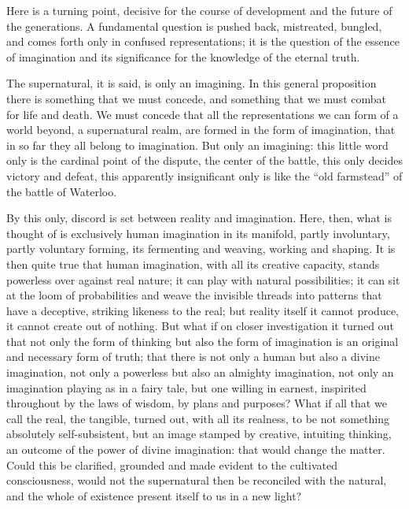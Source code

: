 \documentclass[12pt,a4paper,openany]{book}
\newcommand{\opage}[1]{\marginnote{\footnotesize\textit{[#1]}}}
\begin{document}
Here is a turning point, decisive for the course of development and the future of the generations. A fundamental
question is
\setcounter{footnote}{0}%
\opage{11}pushed back, mistreated, bungled, and comes forth only in confused representations; it is the question of
the essence of imagination and its significance for the knowledge of the eternal truth.

The supernatural, it is said, is only an imagining. In this general proposition there is something that we must
concede, and something that we must combat for life and death. We must concede that all the representations we can
form of a world beyond, a supernatural realm, are formed in the form of imagination, that in so far they all belong to
imagination. But only an imagining: this little word only is the cardinal point of the dispute, the center of the
battle, this only decides victory and defeat, this apparently insignificant only is like the ``old farmstead'' of the
battle of Waterloo.

By this only, discord is set between reality and imagination. Here, then, what is thought of is exclusively human
imagination in its manifold, partly involuntary, partly voluntary forming, its fermenting and weaving, working and
shaping. It is then quite true that human imagination, with all its creative capacity, stands powerless over against
real nature; it can play with natural possibilities; it can sit at the loom of probabilities and weave the invisible
threads into patterns that have a deceptive, striking likeness to the real; but reality itself it cannot produce, it
cannot create out of nothing. But what if on closer investigation it turned out that not only the form of thinking but
also the form of imagination is an original and necessary form of truth; that there is not only a human but also a
divine imagination, not only a powerless but also an almighty
\setcounter{footnote}{0}%
\opage{12}imagination, not only an imagination playing as in a fairy tale, but one willing in earnest, inspirited
throughout by the laws of wisdom, by plans and purposes? What if all that we call the real, the tangible, turned out,
with all its realness, to be not something absolutely self-subsistent, but an image stamped by creative, intuiting
thinking, an outcome of the power of divine imagination: that would change the matter. Could this be clarified,
grounded and made evident to the cultivated consciousness, would not the supernatural then be reconciled with the
natural, and the whole of existence present itself to us in a new light?
\end{document}
